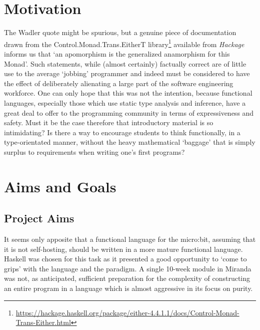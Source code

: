 \documentclass[12pt, a4paper]{report}
\begin{document}
\section{Motivation}
The Wadler quote might be spurious, but a genuine piece of documentation drawn from the Control.Monad.Trans.EitherT
library\footnote{\url{https://hackage.haskell.org/package/either-4.4.1.1/docs/Control-Monad-Trans-Either.html}}
available from \textit{Hackage} informs us that `an apomorphism is the generalized anamorphism for this 
Monad'.  Such statements, while (almost certainly) factually correct are of little use to the
average `jobbing' programmer and indeed must be considered to have the effect of deliberately alienating a large part
of the software engineering workforce. One can only hope that this was not the intention, because
functional languages, especially those which use static type analysis and inference, have a great
deal to offer to the programming community in terms of expressiveness and safety. Must it be the
case therefore that introductory material is so intimidating? Is there a way to encourage students
to think functionally, in a type-orientated manner, without the heavy mathematical `baggage' that is
simply surplus to requirements when writing one's first programs?

\section{Aims and Goals}
\subsection{Project Aims}
It seems only apposite that a functional language for the micro:bit, assuming that it is not
self-hosting, should be written in a more mature functional language. Haskell was chosen for this
task as it presented a good opportunity to `come to grips' with the language and the paradigm. A
single 10-week module in Miranda was not, as anticipated, sufficient preparation for the complexity
of constructing an entire program in a language which is almost aggressive in its focus on purity. 
\end{document}
